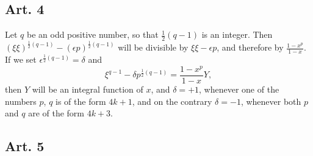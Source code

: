 \documentclass{book}
\theoremstyle{plain}
\theoremstyle{remark}
\begin{document}
\subsection*{Art. 4}

Let $q$ be an odd positive number, so that $\tfrac{1}{2}(q-1)$ is an integer.  Then $(\xi \xi)^{\tfrac{1}{2}(q-1)} - (\epsilon p)^{\frac{1}{2}(q-1)}$ will be divisible by $\xi \xi - \epsilon p$, and therefore by $\frac{1-x^p}{1-x}$.  If we set $\epsilon^{\frac{1}{2}(q-1)} = \delta$ and 
\[ \xi^{q-1} - \delta p^{\frac{1}{2}(q-1)} = \frac{1-x^p}{1-x} Y, \]
then $Y$ will be an integral function of $x$, and $\delta = +1$, whenever one of the numbers $p$, $q$ is of the form $4k+1$, and on the contrary $\delta =-1$, whenever both $p$ and $q$ are of the form $4k+3$.

\subsection*{Art. 5} 
\end{document}
